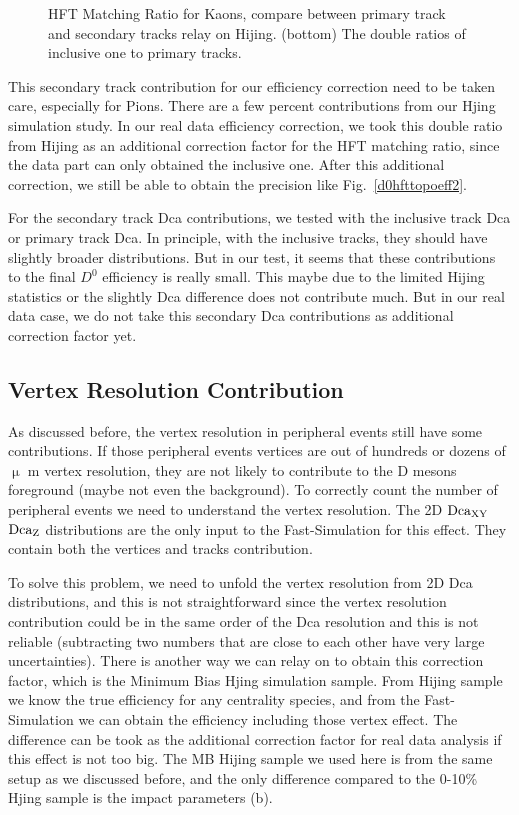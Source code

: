 \documentclass[a4paper]{article}
\begin{document}
\begin{figure}[htbp]
\begin{minipage}[htbp]{0.47\linewidth}
\caption{ HFT Matching Ratio for Kaons, compare between primary track and secondary tracks relay on Hijing.  (bottom) The double ratios of inclusive one to primary tracks.\label{HijingKaonsRatio}}
\end{minipage}
\end{figure}

This secondary track contribution for our efficiency correction need to be taken care, especially for Pions. There are a few percent contributions from our Hjing simulation study. In our real data efficiency correction, we took this double ratio from Hijing as an additional correction factor for the HFT matching ratio, since the data part can only obtained the inclusive one. After this additional correction, we still be able to obtain the precision like Fig.~\ref{d0hfttopoeff2}.

For the secondary track Dca contributions, we tested with the inclusive track Dca or primary track Dca. In principle, with the inclusive tracks, they should have slightly broader distributions. But in our test, it seems that these contributions to the final $D^0$ efficiency is really small. This maybe due to the limited Hijing statistics or the slightly Dca difference does not contribute much. But in our real data case, we do not take this secondary Dca contributions as additional correction factor yet.


\subsection{Vertex Resolution Contribution}
\label{concern2}

As discussed before, the vertex resolution in peripheral events still have some contributions. If those peripheral events vertices are out of hundreds or dozens of $\upmu$ m vertex resolution, they are not likely to contribute to the D mesons foreground (maybe not even the background). To correctly count the number of peripheral events we need to understand the vertex resolution. The 2D $\textup{Dca}_{\textup{XY}}$ $\textup{Dca}_\textup{Z}$ distributions are the only input to the Fast-Simulation for this effect. They contain both the vertices and tracks contribution. 

To solve this problem, we need to unfold the vertex resolution from 2D Dca distributions, and this is not straightforward since the vertex resolution contribution could be in the same order of the Dca resolution and this is not reliable (subtracting two numbers that are close to each other have very large uncertainties). There is another way we can relay on to obtain this correction factor, which is the Minimum Bias Hjing simulation sample. From Hijing sample we know the true efficiency for any centrality species, and from the Fast-Simulation we can obtain the efficiency including those vertex effect. The difference can be took as the additional correction factor for real data analysis if this effect is not too big. The MB Hijing sample we used here is from the same setup as we discussed before, and the only difference compared to the 0-10\% Hjing sample is the impact parameters (b).
\end{document}

